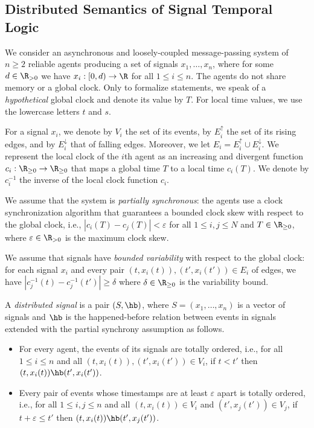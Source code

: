 \subsection{Distributed Semantics of Signal Temporal Logic}

We consider an asynchronous and loosely-coupled message-passing system of $n \geq 2$ reliable agents producing a set of signals $x_1, \ldots, x_n$, where for some $d \in \R_{> 0}$ we have $x_i : [0,d) \to \R$ for all $1 \leq i \leq n$.
%
The agents do not share memory or a global clock.
%
Only to formalize statements, we speak of a \emph{hypothetical} global clock and denote its value by $T$.
%
For local time values, we use the lowercase letters $t$ and $s$.

For a signal $x_i$, we denote by $V_i$ the set of its events, by $E_i^\uparrow$ the set of its rising edges, and by $E_i^\downarrow$ that of falling edges.
Moreover, we let $E_i = E_i^\uparrow \cup E_i^\downarrow$.
%
We represent the local clock of the $i$th agent as an increasing and divergent function $c_i : 
\R_{\geq 0} \to \R_{\geq 0}$ that maps a global time $T$ to a local time $c_i(T)$.
%
We denote by $c_i^{-1}$ the inverse of the local clock function $c_i$.

We assume that the system is \emph{partially synchronous}: the agents use a clock synchronization algorithm that guarantees a bounded clock skew with respect to the global clock, i.e., $|c_i(T) - c_j(T)| < \varepsilon$ for all $1 \leq i,j \leq N$ and $T \in \R_{\geq 0}$, where $\varepsilon \in \R_{> 0}$ is the maximum clock skew.

\alert{
We assume that signals have \emph{bounded variability} with respect to the global clock: for each signal $x_i$ and every pair $(t, x_i(t)), (t', x_i(t')) \in E_i$ of edges, we have $|c_j^{-1}(t) - c_j^{-1}(t')| \geq \delta$ where $\delta \in \R_{\geq 0}$ is the variability bound.
}

\begin{definition} \label{defn:hb}
	A \emph{distributed signal} is a pair $(S, {\hb})$, where $S = (x_1, \ldots, x_n)$ is a vector of 
	signals and ${\hb}$ is the happened-before relation between events in signals extended with the 
	partial synchrony assumption as follows.
	\begin{itemize}
		\item For every agent, the events of its signals are totally ordered, i.e., for all $1 \leq i \leq n$ and all $(t, x_i(t)), (t', x_i(t')) \in V_i$, if $t < t'$ then $(t, x_i(t)) \hb (t', x_i(t'))$.
		\item Every pair of events whose timestamps are at least $\varepsilon$ apart is totally ordered, i.e., for all $1 \leq i,j \leq n$ and all $(t, x_i(t)) \in V_i$ and $(t', x_j(t')) \in V_j$, if $t + \varepsilon \leq t'$ then $(t, x_i(t)) \hb (t', x_j(t'))$.
	\end{itemize}
\end{definition}

